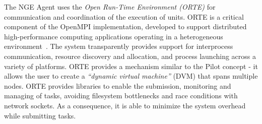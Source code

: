 


The NGE Agent uses the \emph{Open Run-Time Environment (ORTE)} for communication
and coordination of the execution of units. ORTE is a critical component of the
OpenMPI implementation, developed to support distributed high-performance
computing applications operating in a heterogeneous environment~\cite{XXX}. The
system  transparently provides support for interprocess
communication, resource discovery and allocation, and process launching across a
variety of platforms. ORTE provides a mechanism similar to the Pilot concept -
it allows the user to create a \emph{``dynamic virtual machine''} (DVM) that
spans multiple nodes. ORTE provides libraries to enable the submission,
monitoring and managing of tasks, avoiding filesystem bottlenecks and race
conditions with network sockets. As a consequence, it is able to minimize the
system overhead while submitting tasks.

%


